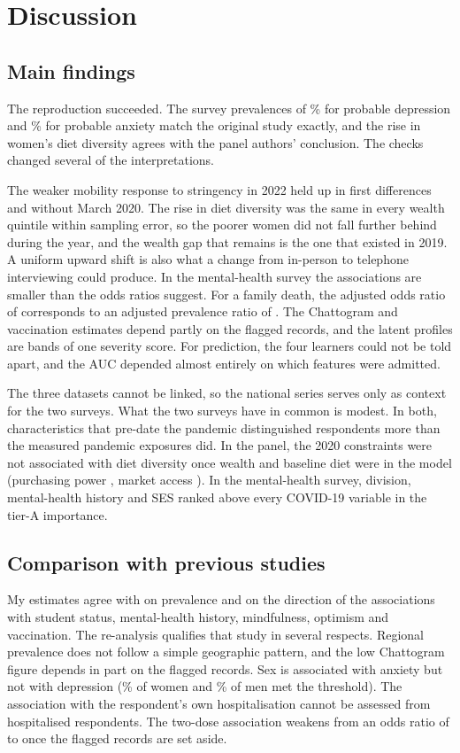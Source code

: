 \chapter{Discussion}\label{ch:discussion}

\section{Main findings}
The reproduction succeeded. The survey prevalences of \PrevDep\% for probable depression and \PrevAnx\% for probable anxiety match the original study exactly, and the rise in women's diet diversity agrees with the panel authors' conclusion. The checks changed several of the interpretations.

The weaker mobility response to stringency in 2022 held up in first differences and without March 2020. The rise in diet diversity was the same in every wealth quintile within sampling error, so the poorer women did not fall further behind during the year, and the wealth gap that remains is the one that existed in 2019. A uniform upward shift is also what a change from in-person to telephone interviewing could produce. In the mental-health survey the associations are smaller than the odds ratios suggest. For a family death, the adjusted odds ratio of \OrFamDeathB{} corresponds to an adjusted prevalence ratio of \PrFamDeathB. The Chattogram and vaccination estimates depend partly on the flagged records, and the latent profiles are bands of one severity score. For prediction, the four learners could not be told apart, and the AUC depended almost entirely on which features were admitted.

The three datasets cannot be linked, so the national series serves only as context for the two surveys. What the two surveys have in common is modest. In both, characteristics that pre-date the pandemic distinguished respondents more than the measured pandemic exposures did. In the panel, the 2020 constraints were not associated with diet diversity once wealth and baseline diet were in the model (purchasing power \PanPPPp, market access \PanMKTp). In the mental-health survey, division, mental-health history and SES ranked above every COVID-19 variable in the tier-A importance.

\section{Comparison with previous studies}
My estimates agree with \textcite{islam2023} on prevalence and on the direction of the associations with student status, mental-health history, mindfulness, optimism and vaccination. The re-analysis qualifies that study in several respects. Regional prevalence does not follow a simple geographic pattern, and the low Chattogram figure depends in part on the flagged records. Sex is associated with anxiety but not with depression (\DepFemale\% of women and \DepMale\% of men met the threshold). The association with the respondent's own hospitalisation cannot be assessed from \MhHospN{} hospitalised respondents. The two-dose association weakens from an odds ratio of \OrTwoDose{} to \SensVaxExcl{} once the flagged records are set aside.

